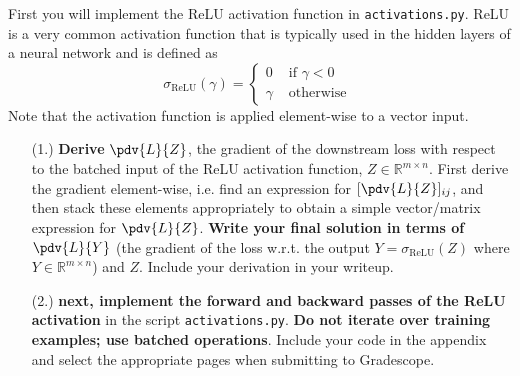 \documentclass{article}
\begin{document}
First you will implement the ReLU activation function in \texttt{activations.py}. ReLU is a very common activation function that is typically used in the hidden layers of a neural network and is defined as 
    \begin{equation*}
        \sigma_{\text{ReLU}}(\gamma) = \begin{cases}
            0 &\text{ if } \gamma < 0 \\
            \gamma &\text{ otherwise }    
        \end{cases}
    \end{equation*}
Note that the activation function is applied element-wise to a vector input. 
    \begin{itemize}
        \item [(1.)] \textbf{Derive} $\pdv{L}{Z}$, the gradient of the downstream loss with respect to the batched input of the ReLU activation function, $Z \in \mathbb{R}^{m \times n}$. First derive the gradient element-wise, i.e. find an expression for $[\pdv{L}{Z}]_{ij}$, and then stack these elements appropriately to obtain a simple vector/matrix expression for $\pdv{L}{Z}$. \textbf{Write your final solution in terms of} $\pdv{L}{Y}$ (the gradient of the loss w.r.t. the output $Y = \sigma_{\text{ReLU}}(Z)$ where $Y \in \mathbb{R}^{m \times n}$) and $Z$. Include your derivation in your writeup.

        \item [(2.)] \textbf{next, implement the forward and backward passes of the ReLU activation} in the script \texttt{activations.py}. \textbf{Do not iterate over training examples; use batched operations}. Include your code in the appendix and select the appropriate pages when submitting to Gradescope.
    \end{itemize}
\end{document}
